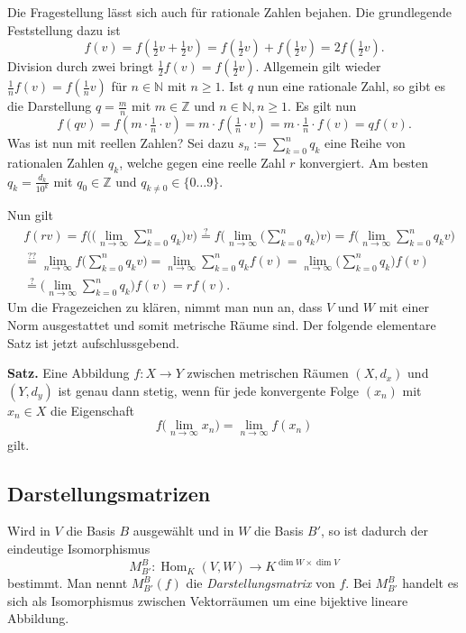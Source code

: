 \documentclass[a4paper,11pt,fleqn,twoside]{scrartcl}
\numberwithin{equation}{section}
\newcommand{\N}{\mathbb N}
\newcommand{\Z}{\mathbb Z}
\begin{document}
Die Fragestellung lässt sich auch für rationale Zahlen bejahen.
Die grundlegende Feststellung dazu ist
\begin{equation}
f(v) = f(\tfrac{1}{2}v+\tfrac{1}{2}v) = f(\tfrac{1}{2}v) + f(\tfrac{1}{2}v)
= 2f(\tfrac{1}{2}v).
\end{equation}
Division durch zwei bringt $\tfrac{1}{2}f(v) = f(\tfrac{1}{2}v)$.
Allgemein gilt wieder $\frac{1}{n}f(v) = f(\tfrac{1}{n}v)$ für
$n\in\N$ mit $n\ge 1$. Ist $q$ nun eine rationale Zahl, so gibt
es die Darstellung $q=\frac{m}{n}$ mit $m\in\Z$ und $n\in\N, n\ge 1$.
Es gilt nun
\begin{equation}
f(qv) = f(m\cdot\tfrac{1}{n}\cdot v) = m\cdot f(\tfrac{1}{n}\cdot v)
= m\cdot\tfrac{1}{n}\cdot f(v) = qf(v).
\end{equation}
Was ist nun mit reellen Zahlen? Sei dazu $s_n:=\sum_{k=0}^n q_k$
eine Reihe von rationalen Zahlen $q_k$, welche gegen eine reelle
Zahl $r$ konvergiert. Am besten $q_k = \frac{d_k}{10^k}$ mit
$q_0\in\Z$ und $q_{k\ne 0}\in\{0\ldots 9\}$.

Nun gilt
\begin{equation}
\begin{split}
&f(rv) = f\bigg(\bigg(\lim_{n\to\infty}\sum_{k=0}^n q_k\bigg)v\bigg)
\stackrel{?}= f\bigg(\lim_{n\to\infty}\bigg(\sum_{k=0}^n q_k\bigg)v\bigg)
= f\bigg(\lim_{n\to\infty}\sum_{k=0}^n q_k v\bigg)\\
&\stackrel{??}= \lim_{n\to\infty} f\bigg(\sum_{k=0}^n q_k v\bigg)
= \lim_{n\to\infty}\sum_{k=0}^n q_k f(v)
= \lim_{n\to\infty}\bigg(\sum_{k=0}^n q_k\bigg) f(v)\\
&\stackrel{?}= \bigg(\lim_{n\to\infty}\sum_{k=0}^n q_k\bigg) f(v)
= r f(v).
\end{split}
\end{equation}
Um die Fragezeichen zu klären, nimmt man nun an, dass $V$ und $W$
mit einer Norm ausgestattet und somit metrische Räume sind.
Der folgende elementare Satz ist jetzt aufschlussgebend.

\textbf{Satz.} Eine Abbildung $f\colon X\to Y$ zwischen metrischen
Räumen $(X,d_x)$ und $(Y,d_y)$ ist genau dann stetig, wenn für
jede konvergente Folge $(x_n)$ mit $x_n\in X$ die Eigenschaft
\begin{equation}
f\Big(\lim_{n\to\infty} x_n\Big) = \lim_{n\to\infty} f(x_n)
\end{equation}
gilt.

\subsection{Darstellungsmatrizen}
Wird in $V$ die Basis $B$ ausgewählt und in $W$ die Basis $B'$,
so ist dadurch der eindeutige Isomorphismus
\begin{equation}
M_{B'}^B\colon \operatorname{Hom}_K(V,W)\to K^{\dim W\times\dim V}
\end{equation}
bestimmt. Man nennt $M_{B'}^B(f)$ die \emph{Darstellungsmatrix}
von $f$. Bei $M_{B'}^B$ handelt es sich als Isomorphismus zwischen
Vektorräumen um eine bijektive lineare Abbildung.
\end{document}
